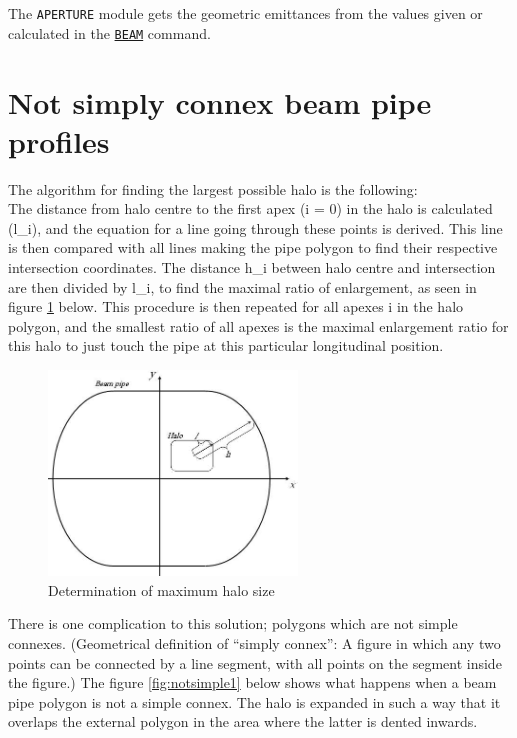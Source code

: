 \begin{5.02.05}
The {\tt APERTURE} module gets the geometric emittances from the values given 
or calculated in the \hyperref[chap:beam]{\tt BEAM} command. 
\end{5.02.05}

\section{Not simply connex beam pipe profiles} 
\label{sec:notconnex}
The algorithm for finding the largest possible halo is the following: \\
The distance from halo centre to the first apex (i = 0)
in the halo is calculated (l\_i), and the equation for a line going
through these points is derived. This line is then compared with all
lines making the pipe polygon to find their respective intersection
coordinates. The distance h\_i between halo centre and intersection are
then divided by l\_i, to find the maximal ratio of enlargement, as seen
in figure \ref{fig:notsimple0} below. 
This procedure is then repeated for all apexes i in the halo
polygon, and the smallest ratio  of all apexes is the maximal
enlargement ratio for this halo to just touch the pipe at this
particular longitudinal position. 

\begin{figure}[h]
  \begin{center}
    \includegraphics[width=250px]{jpg/notsimple0.jpg}
    \caption{Determination of maximum halo size}
    \label{fig:notsimple0}
  \end{center}
\end{figure}

There is one complication to this solution; polygons which are not
simple connexes. (Geometrical definition of ``simply connex'': A figure
in which any two points can be connected by a line segment, with all
points on the segment inside the figure.) The figure \ref{fig:notsimple1}
below shows what happens when a beam pipe polygon is not a simple
connex. The halo is expanded in such a way that it overlaps the external
polygon in the area where the latter is dented inwards. 

